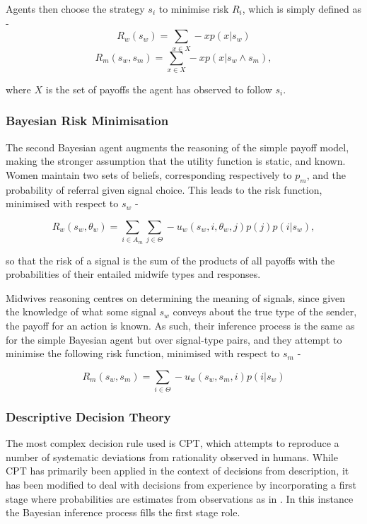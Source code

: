 Agents then choose the strategy $s_{i}$ to minimise risk $R_{i}$, which is simply defined as - 
\begin{equation}
R_{w}(s_{w}) = \sum_{x \in X} -xp(x | s_{w})
\end{equation}
\begin{equation}
R_{m}(s_{w}, s_{m}) = \sum_{x \in X} -xp(x | s_{w}\wedge s_{m}),
\end{equation}

where $X$ is the set of payoffs the agent has observed to follow $s_{i}$.

\subsubsection{Bayesian Risk Minimisation}

The second Bayesian agent augments the reasoning of the simple payoff model, making the stronger assumption that the utility function is static, and known. Women maintain two sets of beliefs, corresponding respectively to \(p_{m}\), and the probability of referral given signal choice. This leads to the risk function, minimised with respect to \(s_{w}\) -

\begin{equation}
R_{w}(s_{w}, \theta_{w}) = \sum_{i\in A_{m}}\sum_{j\in \Theta} -u_{w}(s_{w}, i, \theta_{w}, j)p(j)p(i | s_{w}),
\end{equation}

so that the risk of a signal is the sum of the products of all payoffs with the probabilities of their entailed midwife types and responses.

Midwives reasoning centres on determining the meaning of signals, since given the knowledge of what some signal \(s_{w}\) conveys about the true type of the sender, the payoff for an action is known. As such, their inference process is the same as for the simple Bayesian agent but over signal-type pairs, and they attempt to minimise the following risk function, minimised with respect to \(s_{m}\) -

\begin{equation}
R_{m}(s_{w}, s_{m}) = \sum_{i\in \Theta} -u_{w}(s_{w}, s_{m}, i)p(i | s_{w})
\end{equation}

\subsubsection{Descriptive Decision Theory}

The most complex decision rule used is \ac{CPT}, which attempts to reproduce a number of systematic deviations from rationality observed in humans. While \ac{CPT} has primarily been applied in the context of decisions from description, it has been modified to deal with decisions from experience by incorporating a first stage where probabilities are estimates from observations as in \cite{FoxCPT}. In this instance the Bayesian inference process fills the first stage role.

